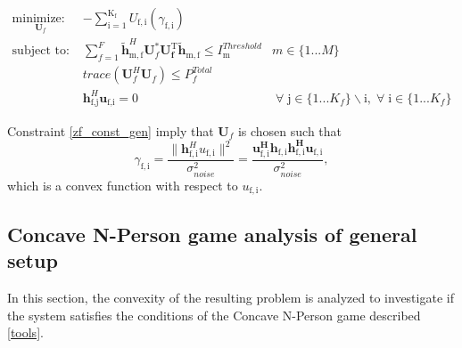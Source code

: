 \documentclass[12pt,a4paper]{report}
\begin{document}
	\begin{subequations}
	\label{optim}
	\begin{align}
	    \underset{\mathbf{U}_{f} }{\text{minimize: }} \;
	    & - \sum_{\mathrm{i=1}}^{\mathrm{K_f}}
    	U_{\mathrm{f,i}}(\gamma_{\mathrm{f,i}}) \label{player_opt} \\
	    \text{subject to: } \; &
	   \sum^F_{f=1} \mathbf{\tilde{h}}_{\mathrm{m,f}}^H  \mathbf{U}_{f}^*		
	\mathbf{U_{f}^{\mathrm{T}}} \mathbf{\tilde{h}_{\mathrm{m,f}}} \leq I^{Threshold}		
	_{\mathrm{m}} & m \in \{1 ...M\} 
		\label{interference_const_gen}\\
        & trace(\mathbf{U}_{f}^H\mathbf{U}_{f}) \leq P^{Total}_{f} \label{power_const_gen}\\
        & \mathbf{h}_{\text{f,j}}^H\mathbf{u}_{\text{f,i}} =0\ & \; \forall \; \text{j} \in \{1... K_{f}\}\backslash \text{i} ,\; \forall \; \text{i} \in \{1 ... K_{f}\} \label{zf_const_gen}
	\end{align}
	\end{subequations}


Constraint \eqref{zf_const_gen} imply that $\mathbf{U}_{f}$ is chosen such that  
	\begin{equation}\label{zf_snr}
	\gamma_{\mathrm{f,i}} = \frac{\|\mathbf{h}^H_{\mathrm{f,i}}u_{\mathrm{f,i}}\|^2}
	{\sigma^2_{noise}  
	}
	= 
	\frac{\mathbf{u^H_{\mathrm{f,i}}h_{\mathrm{f,i}}h^H_{\mathrm{f,i}}u_{\mathrm{f,i}}}}
	{\sigma^2_{noise}  
	},
	\end{equation}
	which is a convex function with respect to $u_{\mathrm{f,i}}$.
	
\subsection{Concave N-Person game analysis of general setup}
In this section, the convexity of the resulting problem is analyzed to investigate if the system satisfies the conditions of the Concave N-Person game described \ref{tools}. 
\end{document}
